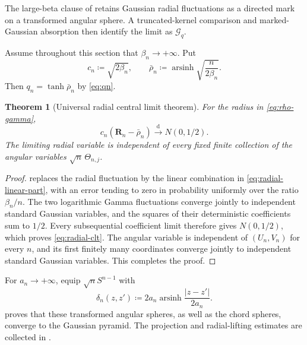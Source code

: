\documentclass[10pt,a4paper]{amsart}
\numberwithin{equation}{section}
\newtheorem{theorem}{Theorem}[section]
\DeclareMathOperator{\arsinh}{arsinh}
\begin{document}
The large-beta clause of  retains Gaussian radial fluctuations as a directed mark on a transformed angular sphere.  A truncated-kernel comparison and marked-Gaussian absorption then identify the limit as $\mathcal G_q$.

Assume throughout this section that $\beta_n\to+\infty$.  Put
\begin{equation}\label{eq:large-beta-reference} c_n\coloneqq\sqrt{2\beta_n}, \qquad \bar\rho_n\coloneqq\arsinh\sqrt{\frac{n}{2\beta_n}}. \end{equation}
Then $q_n=\tanh\bar\rho_n$ by \eqref{eq:qn}.

\begin{theorem}[Universal radial central limit theorem]\label{thm:radial-clt}
For the radius in \eqref{eq:rho-gamma},
\begin{equation}\label{eq:radial-clt} c_n(\mathbf R_n-\bar\rho_n)\overset{\mathrm{d}}{\longrightarrow} N(0,1/2). \end{equation}
The limiting radial variable is independent of every fixed finite collection of the angular variables $\sqrt n\,\Theta_{n,j}$.
\end{theorem}

\begin{proof}
 replaces the radial fluctuation by the linear combination in \eqref{eq:radial-linear-part}, with an error tending to zero in probability uniformly over the ratio $\beta_n/n$.  The two logarithmic Gamma fluctuations converge jointly to independent standard Gaussian variables, and the squares of their deterministic coefficients sum to $1/2$.  Every subsequential coefficient limit therefore gives $N(0,1/2)$, which proves \eqref{eq:radial-clt}.  The angular variable is independent of $(U_n,V_n)$ for every $n$, and its first finitely many coordinates converge jointly to independent standard Gaussian variables.  This completes the proof.
\end{proof}

For $a_n\to+\infty$, equip $\sqrt nS^{n-1}$ with
\begin{equation}\label{eq:transformed-sphere-metric} \delta_n(z,z')\coloneqq2a_n\arsinh\frac{|z-z'|}{2a_n}. \end{equation}
 proves that these transformed angular spheres, as well as the chord spheres, converge to the Gaussian pyramid.  The projection and radial-lifting estimates are collected in .
\end{document}
